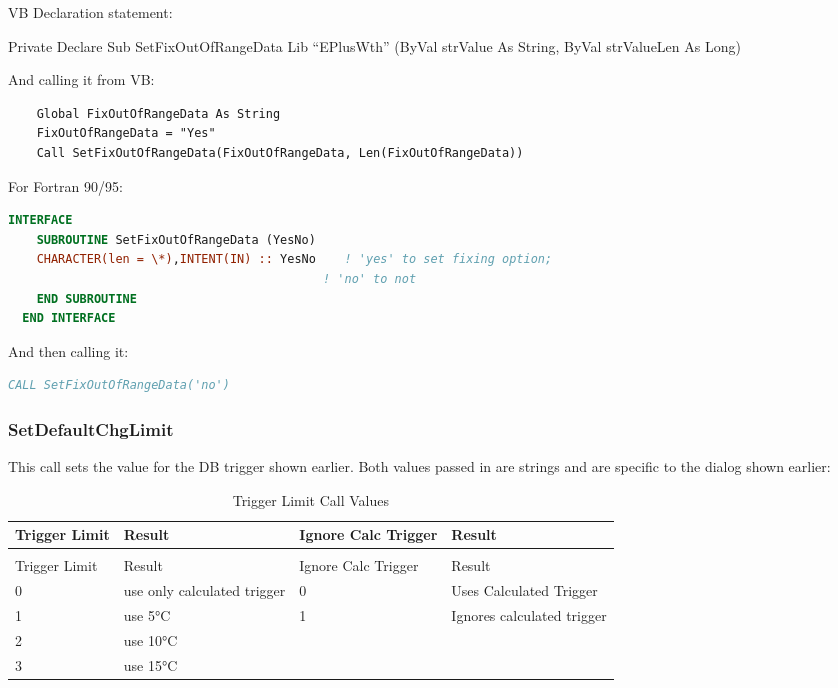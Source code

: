 VB Declaration statement:

Private Declare Sub SetFixOutOfRangeData Lib ``EPlusWth'' (ByVal strValue As String, ByVal strValueLen As Long)

And calling it from VB:

\begin{lstlisting}
    Global FixOutOfRangeData As String
    FixOutOfRangeData = "Yes"
    Call SetFixOutOfRangeData(FixOutOfRangeData, Len(FixOutOfRangeData))
\end{lstlisting}

For Fortran 90/95:

\begin{lstlisting}[language=Fortran]
  INTERFACE
    SUBROUTINE SetFixOutOfRangeData (YesNo)
    CHARACTER(len = \*),INTENT(IN) :: YesNo    ! 'yes' to set fixing option;
                                            ! 'no' to not
    END SUBROUTINE
  END INTERFACE
\end{lstlisting}

And then calling it:

\begin{lstlisting}[language=Fortran]
CALL SetFixOutOfRangeData('no')
\end{lstlisting}

\subsubsection{SetDefaultChgLimit}\label{setdefaultchglimit}

This call sets the value for the DB trigger shown earlier. Both values passed in are strings and are specific to the dialog shown earlier:

\begin{longtable}[c]{p{1.0in}p{2.0in}p{1.2in}p{1.8in}}
\caption{Trigger Limit Call Values \label{table:trigger-limit-call-values}} \tabularnewline
\toprule 
Trigger Limit & Result & Ignore Calc Trigger & Result \tabularnewline
\midrule
\endfirsthead

\caption[]{Trigger Limit Call Values} \tabularnewline
\toprule 
Trigger Limit & Result & Ignore Calc Trigger & Result \tabularnewline
\midrule
\endhead

0 & use only calculated trigger & 0 & Uses Calculated Trigger \tabularnewline
1 & use 5°C & 1 & Ignores calculated trigger \tabularnewline
2 & use 10°C &  &  \tabularnewline
3 & use 15°C &  &  \tabularnewline
\bottomrule
\end{longtable}

